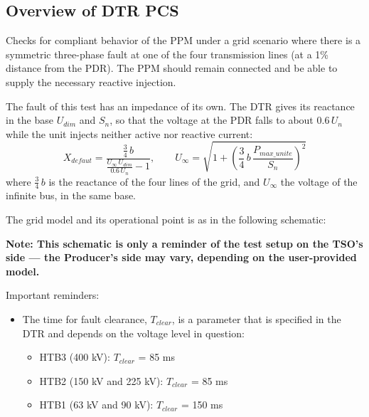     \subsection{Overview of DTR PCS \DTRPcs}

    Checks for compliant behavior of the PPM under a grid scenario where there
    is a symmetric three-phase fault at one of the four transmission lines
    (at a 1\% distance from the PDR). The PPM should remain connected and
    be able to supply the necessary reactive injection.

    The fault of this test has an impedance of its own. The DTR gives its reactance
    in the base $U_{dim}$ and $S_n$, so that the voltage at the PDR falls to
    about $0.6\,U_n$ while the unit injects neither active nor reactive current:
    \[
        X_{defaut} = \frac{\frac{3}{4}\,b}{\frac{U_\infty\,U_{dim}}{0.6\,U_n} - 1},
        \qquad
        U_\infty = \sqrt{1 + \left(\frac{3}{4}\,b\,\frac{P_{max\_unite}}{S_n}\right)^2}
    \]
    where $\frac{3}{4}\,b$ is the reactance of the four lines of the grid, and
    $U_\infty$ the voltage of the infinite bus, in the same base.

    The grid model and its operational point is as in the following schematic:
    \begin{center}
        
    \end{center}
    \begin{center}
        \small \textbf{Note: This schematic is only a reminder of the test setup on the TSO's
        side --- the Producer's side may vary, depending on the user-provided model.}
    \end{center}

    \noindent Important reminders:
    \begin{itemize}
        \item The time for fault clearance, $T_{clear}$, is a parameter that
        is specified in the DTR and depends on the voltage level in
        question:
        \begin{itemize}
            \item HTB3 (400 kV): $T_{clear}$ = 85 ms
            \item HTB2 (150 kV and 225 kV): $T_{clear}$ = 85 ms
            \item HTB1 (63 kV and 90 kV): $T_{clear}$ = 150 ms
        \end{itemize}
    \end{itemize}

